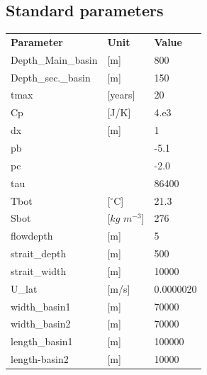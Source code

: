 \documentclass[twocolumn]{article}
\begin{document}
\clearpage
\pagebreak
\begin{appendices}
\section{Standard parameters}
\label{app:standard_parameters}
\begin{table}[H]
\begin{tabular}{lll}
\textbf{Parameter}          &\textbf{Unit}                  & \textbf{Value} \\   
Depth\_Main\_basin          &{[}m{]}                        & 800       \\
Depth\_sec.\_basin          &{[}m{]}                        & 150       \\
tmax                        &{[}years{]}                    & 20            \\
Cp                          &{[}J/K{]}                      & 4.e3      \\
dx                          &{[}m{]}                        & 1         \\
pb                          &                               & -5.1      \\
pc                          &                               & -2.0      \\
tau                         &                               & 86400     \\
Tbot                        &{[}$^{\circ}$C{]}              & 21.3      \\
Sbot                        &{[}$kg$ $m^{-3}${]}            & 276       \\
flowdepth                   &{[}m{]}                        & 5         \\
strait\_depth               &{[}m{]}                        & 500       \\
strait\_width               &{[}m{]}                        & 10000     \\
U\_lat                      &{[}m/s{]}                      & 0.0000020 \\
width\_basin1               &{[}m{]}                        & 70000     \\
width\_basin2               &{[}m{]}                        & 70000     \\
length\_basin1              &{[}m{]}                        & 100000    \\
length-basin2               &{[}m{]}                        & 10000     \\

\end{tabular}
\end{table}
\end{appendices}
\end{document}

